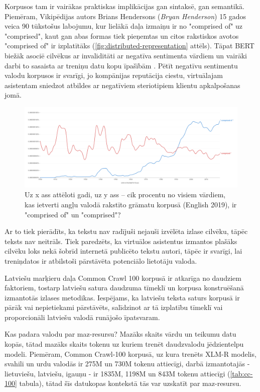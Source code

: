 Korpusos tam ir vairākas praktiskas implikācijas gan sintaksē, gan semantikā. Piemēram, Vikipēdijas autors Brians Hendersons (\textit{Bryan Henderson}) 15 gados veica 90 tūkstošus labojumu, kur lielākā daļa izmaiņu ir no "comprised of" uz "comprised", kaut gan abas formas tiek pieņemtas un citos rakstiskos avotos "comprised of" ir izplatītāks (\ref{fig:distributed-representation} attēls). Tāpat BERT biežāk asociē cilvēkus ar invaliditāti ar negatīva sentimenta vārdiem un vairāki darbi to sasaista ar treniņu datu kopu īpašībām \cite{bender2021}. Pētīt negatīvu sentimentu valodu korpusos ir svarīgi, jo kompānijas reputācija ciestu, virtuālajam asistentam sniedzot atbildes ar negatīviem steriotipiem klientu apkalpošanas jomā.


\begin{figure}[h]
    \centering
    \includegraphics[width=\textwidth]{figures/comprised.png}
    \caption{Uz x ass attēloti gadi, uz y ass -- cik procentu no visiem vārdiem, kas ietverti angļu valodā rakstīto grāmatu korpusā (English 2019), ir "comprised of" un "comprised"? \cite{ngram-viewer}}
    \label{fig:comprised}
\end{figure}

Ar to tiek pierādīts, ka tekstu nav radījuši nejauši izvēlēta izlase cilvēku, tāpēc teksts nav neitrāls. Tiek paredzēts, ka virtuālos asistentus izmantos plašāks cilvēku loks nekā šobrīd internetā publicēto tekstu autori, tāpēc ir svarīgi, lai treniņdatos ir atbilstoši pārstāvēta potenciālo lietotāju valoda.


Latviešu marķieru daļa Common Crawl 100 korpusā ir atkarīga no daudziem faktoriem, tostarp latviešu satura daudzuma tīmeklī un korpusa konstruēšanā izmantotās izlases metodikas. Iespējams, ka latviešu teksta saturs korpusā ir pārāk vai nepietiekami pārstāvēts, salīdzinot ar tā izplatību tīmeklī vai proporcionāli latviešu valodā runājošo īpatsvaram.


Kas padara valodu par maz-resursu? Mazāks skaits vārdu un teikumu datu kopās, tātad mazāks skaits tokenu uz kuriem trenēt daudzvalodu jēdzientelpu modeli. Piemēram, Common Crawl-100 korpusā, uz kura trenēts XLM-R modelis, svahili un urdu valodās ir 275M un 730M tokenu attiecīgi, darbā izmantotajās - lietuviešu, latviešu, igauņu - ir 1835M, 1198M un 843M tokenu attiecīgi (\ref{tab:cc-100} tabula), tātad šīs datukopas kontekstā tās var uzskatīt par maz-resursu.



